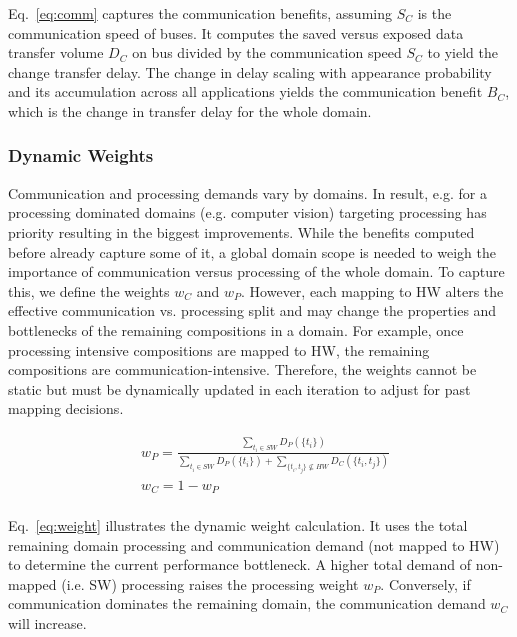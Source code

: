 Eq.~\eqref{eq:comm} captures the communication benefits, assuming $S_C$ is the communication speed of buses. It computes the saved versus exposed data transfer volume $D_C$ on bus divided by the communication speed $S_C$ to yield the change transfer delay. The change in delay scaling with appearance probability and its accumulation across all applications yields the communication benefit $B_C$, which is the change in transfer delay for the whole domain.


\subsubsection{Dynamic Weights}
\label{sub:weight}
Communication and processing demands vary by domains. In result, e.g. for a processing dominated domains (e.g. computer vision) targeting processing has priority resulting in the biggest improvements. While the benefits computed before already capture some of it, a global domain scope is needed to weigh the importance of communication versus processing of the whole domain. To capture this, we define the weights $w_C$ and $w_P$. 
However, each mapping to HW alters the effective communication vs. processing split and may change the properties and bottlenecks of the remaining compositions in a domain. For example, once processing intensive compositions are mapped to HW, the remaining compositions are communication-intensive. Therefore, the weights cannot be static but must be dynamically updated in each iteration to adjust for past mapping decisions.

\begingroup\makeatletter{}\check@mathfonts
\begin{equation}
\begin{split}
\label{eq:weight}
	&w_{P} = \frac{\sum_{t_{i} \in SW} D_{P}(\{t_{i}\}) }{ \sum_{t_{i} \in SW} D_{P}(\{t_{i}\}) + \sum_{ \{t_{i}, t_{j}\} \nsubseteq HW} D_{C}(\{t_{i},t_{j}\}) }\\
	&w_{C} = 1 - w_P\\	
\end{split}
\end{equation}
\endgroup

Eq.~\eqref{eq:weight} illustrates the dynamic weight calculation. It uses the total remaining domain processing and communication demand (not mapped to HW) to determine the current performance bottleneck. A higher total demand of non-mapped (i.e. SW) processing raises the processing weight $w_P$. Conversely, if communication dominates the remaining domain, the communication demand $w_C$ will increase. 

